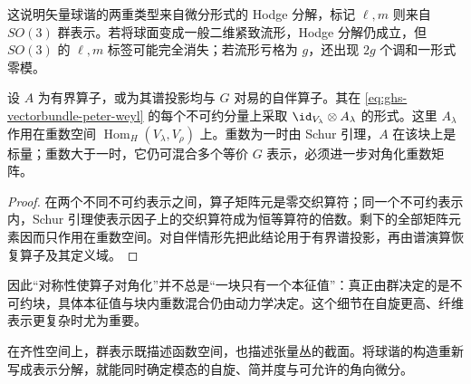 这说明矢量球谐的两重类型来自微分形式的 Hodge 分解，标记 $\ell,m$ 则来自 $SO(3)$ 群表示。若将球面变成一般二维紧致流形，Hodge 分解仍成立，但 $SO(3)$ 的 $\ell,m$ 标签可能完全消失；若流形亏格为 $g$，还出现 $2g$ 个调和一形式零模。


\begin{proposition}[重数空间中的动力学混合]
设 $A$ 为有界算子，或为其谱投影均与 $G$ 对易的自伴算子。其在 \cref{eq:ghs-vectorbundle-peter-weyl} 的每个不可约分量上采取 $\id_{V_\lambda}\otimes A_\lambda$ 的形式。这里 $A_\lambda$ 作用在重数空间 $\operatorname{Hom}_H(V_\lambda,V_\rho)$ 上。重数为一时由 Schur 引理，$A$ 在该块上是标量；重数大于一时，它仍可混合多个等价 $G$ 表示，必须进一步对角化重数矩阵。
\end{proposition}
\begin{proof}
在两个不同不可约表示之间，算子矩阵元是零交织算符；同一个不可约表示内，Schur 引理使表示因子上的交织算符成为恒等算符的倍数。剩下的全部矩阵元素因而只作用在重数空间。对自伴情形先把此结论用于有界谱投影，再由谱演算恢复算子及其定义域。
\end{proof}

因此“对称性使算子对角化”并不总是“一块只有一个本征值”：真正由群决定的是不可约块，具体本征值与块内重数混合仍由动力学决定。这个细节在自旋更高、纤维表示更复杂时尤为重要。


在齐性空间上，群表示既描述函数空间，也描述张量丛的截面。将球谐的构造重新写成表示分解，就能同时确定模态的自旋、简并度与可允许的角向微分。
